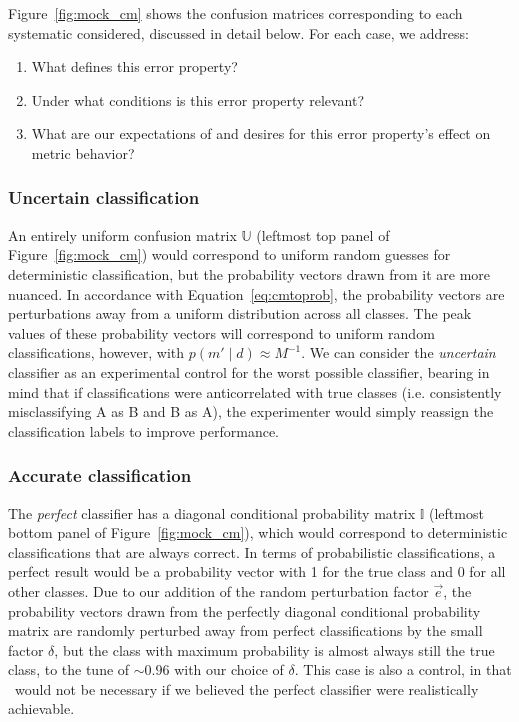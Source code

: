 Figure~\ref{fig:mock_cm} shows the confusion matrices corresponding to each systematic considered, discussed in detail below. For each case, we address:
\begin{enumerate}
  \item What defines this error property?
  \item Under what conditions is this error property relevant?
  \item What are our expectations of and desires for this error property's effect on metric behavior?
\end{enumerate}

\subsubsection{Uncertain classification}
\label{sec:uncertaindata}

An entirely uniform confusion matrix $\mathbb{U}$ (leftmost top panel of Figure~\ref{fig:mock_cm}) would correspond to uniform random guesses for deterministic classification, but the probability vectors drawn from it are more nuanced.
In accordance with Equation~\ref{eq:cmtoprob}, the probability vectors are perturbations away from a uniform distribution across all classes.
The peak values of these probability vectors will correspond to uniform random classifications, however, with $p(m' \mid d)\approx M^{-1}$.
We can consider the \textit{uncertain} classifier as an experimental control for the worst possible classifier, bearing in mind that if classifications were anticorrelated with true classes (i.e. consistently misclassifying A as B and B as A), the experimenter would simply reassign the classification labels to improve performance.

\subsubsection{Accurate classification}
\label{sec:accuratedata}

The \textit{perfect} classifier has a diagonal conditional probability matrix $\mathbb{I}$ (leftmost bottom panel of Figure~\ref{fig:mock_cm}), which would correspond to deterministic classifications that are always correct.
In terms of probabilistic classifications, a perfect result would be a probability vector with 1 for the true class and 0 for all other classes.
Due to our addition of the random perturbation factor $\vec{e}$, the probability vectors drawn from the perfectly diagonal conditional probability matrix are randomly perturbed away from perfect classifications by the small factor $\delta$, but the class with maximum probability is almost always still the true class, to the tune of $\sim0.96$ with our choice of $\delta$.
This case is also a control, in that \plasticc\ would not be necessary if we believed the perfect classifier were realistically achievable.

